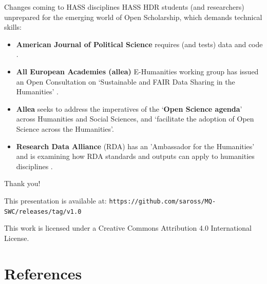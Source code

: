 \documentclass[aspectratio=169, 11pt]{beamer} %
\begin{document}
\begin{frame}{Changes coming to HASS disciplines}
  HASS HDR students (and researchers) unprepared for the emerging world of Open Scholarship, which demands technical skills:
    \begin{itemize}[label=\textbullet]
        \item \textbf{American Journal of Political Science} requires (and tests) data and code \cite{Jacoby2017-lw, Ajps2015-ex}.
        \item \textbf{All European Academies (allea)} E-Humanities working group \cite{Allea2019-wy} has issued an Open Consultation on `Sustainable and FAIR Data Sharing in the Humanities' \cite{Allea2019-aw}.
        \item \textbf{Allea} seeks to address the imperatives of the `\textbf{Open Science agenda}' across Humanities and Social Sciences, and `facilitate the adoption of Open Science across the Humanities'.
        \item \textbf{Research Data Alliance} (RDA) has an 'Ambassador for the Humanities' and is examining how RDA standards and outputs can apply to humanities disciplines \cite{Rda2019-wc}.
    \end{itemize}
\end{frame}

\begin{frame}{Thank you!}


This presentation is available at: \texttt{https://github.com/saross/MQ-SWC/releases/tag/v1.0}

This work is licensed under a Creative Commons Attribution 4.0 International License.

\end{frame}

% 


\section{References}

\begin{multicols}{2}[]


\end{multicols}


  
%   
%   
\end{document}

